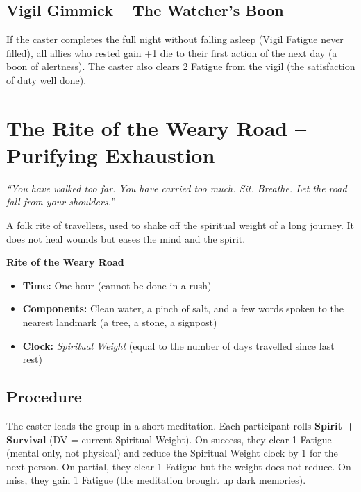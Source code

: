 \documentclass[10pt,a5paper]{book}
\begin{document}
\subsection*{Vigil Gimmick – The Watcher’s Boon}

If the caster completes the full night without falling asleep (Vigil Fatigue never filled), all allies who rested gain +1 die to their first action of the next day (a boon of alertness). The caster also clears 2 Fatigue from the vigil (the satisfaction of duty well done).

\clearpage

\section{The Rite of the Weary Road – Purifying Exhaustion}

\textit{“You have walked too far. You have carried too much. Sit. Breathe. Let the road fall from your shoulders.”}

A folk rite of travellers, used to shake off the spiritual weight of a long journey. It does not heal wounds but eases the mind and the spirit.

\begin{tcolorbox}[colback=blue!5, colframe=blue!70]
\textbf{Rite of the Weary Road}
\begin{itemize}
    \item \textbf{Time:} One hour (cannot be done in a rush)
    \item \textbf{Components:} Clean water, a pinch of salt, and a few words spoken to the nearest landmark (a tree, a stone, a signpost)
    \item \textbf{Clock:} \textit{Spiritual Weight} (equal to the number of days travelled since last rest)
\end{itemize}
\end{tcolorbox}

\subsection*{Procedure}

The caster leads the group in a short meditation. Each participant rolls \textbf{Spirit + Survival} (DV = current Spiritual Weight). On success, they clear 1 Fatigue (mental only, not physical) and reduce the Spiritual Weight clock by 1 for the next person. On partial, they clear 1 Fatigue but the weight does not reduce. On miss, they gain 1 Fatigue (the meditation brought up dark memories).
\end{document}
